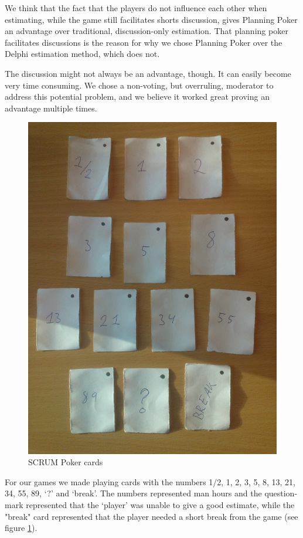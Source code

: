 We think that the fact that the players do not influence each other when estimating, while the game still facilitates shorts discussion, gives Planning Poker an advantage over traditional, discussion-only estimation.
That planning poker facilitates discussions is the reason for why we chose Planning Poker over the Delphi estimation method, which does not.

The discussion might not always be an advantage, though. It can easily become very time consuming. We chose a non-voting, but overruling, moderator to address this potential problem, and we believe it worked great proving an advantage multiple times.

\begin{figure}[t]
  \centering
  \includegraphics[width=\textwidth, angle=270]{illustrations/scrumPokerCards.jpg}
  \caption{SCRUM Poker cards}
  \label{fig:scrumPokerCards}
\end{figure}

For our games we made playing cards with the numbers 1/2, 1, 2, 3, 5, 8, 13, 21, 34, 55, 89, `?' and `break'. The numbers represented man hours and the question-mark represented that the `player' was unable to give a good estimate, while the "break" card represented that the player needed a short break from the game (see figure \ref{fig:scrumPokerCards}).


